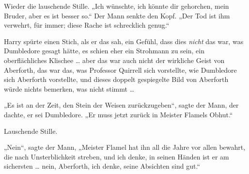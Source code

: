 Wieder die lauschende Stille.
„Ich wünschte, ich könnte dir gehorchen, mein Bruder, aber es ist besser so.“
Der Mann senkte den Kopf.
„Der Tod ist ihm verwehrt, für immer; diese Rache ist schrecklich genug.“

Harry spürte einen Stich, als er das sah, ein Gefühl, dass dies \emph{nicht} das war, was Dumbledore gesagt hätte, es schien eher ein Strohmann zu sein, ein oberflächliches Klischee … aber das war auch nicht der wirkliche Geist von Aberforth, das war das, was Professor Quirrell sich vorstellte, wie Dumbledore sich Aberforth vorstellte, und dieses doppelt gespiegelte Bild von Aberforth würde nichts bemerken, was nicht stimmt …

„Es ist an der Zeit, den Stein der Weisen zurückzugeben“, sagte der Mann, der dachte, er sei Dumbledore.
„Er muss jetzt zurück in Meister Flamels Obhut.“

Lauschende Stille.

„Nein“, sagte der Mann,
„Meister Flamel hat ihn all die Jahre vor allen bewahrt, die nach Unsterblichkeit streben, und ich denke, in seinen Händen ist er am sichersten … nein, Aberforth, ich denke, seine Absichten sind gut.“

